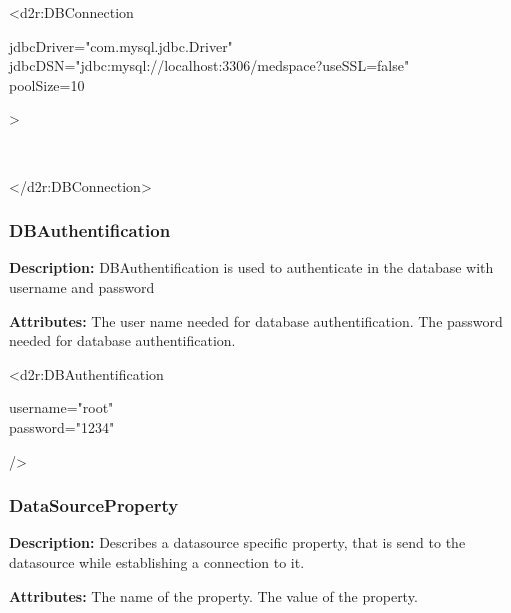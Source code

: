 \begin{ExampleBox}
	<d2r:DBConnection
	\begin{indention}{1cm}
		jdbcDriver="com.mysql.jdbc.Driver"\\
		jdbcDSN="jdbc:mysql://localhost:3306/medspace?useSSL=false"\\
		poolSize=10
	\end{indention}
	>
		\begin{indention}{1cm}
		\\
		\end{indention}
	</d2r:DBConnection>
\end{ExampleBox}

\subsubsection{DBAuthentification}
\textbf{Description:} \newline
DBAuthentification is used to authenticate in the database with username and password

\textbf{Attributes:} \newline
{}
The user name needed for database authentification.
\EndAttribute
{}
The password needed for database authentification.
\EndAttribute

\begin{ExampleBox}
	<d2r:DBAuthentification
	\begin{indention}{1cm}
		username="root"\\
		password="1234"	
	\end{indention}
	/>
\end{ExampleBox}

\subsubsection{DataSourceProperty}
\textbf{Description:} \newline
Describes a datasource specific property, that is send to the datasource while establishing a connection to it.

\textbf{Attributes:} \newline
{}
The name of the property.
\EndAttribute
{}
The value of the property.
\EndAttribute

